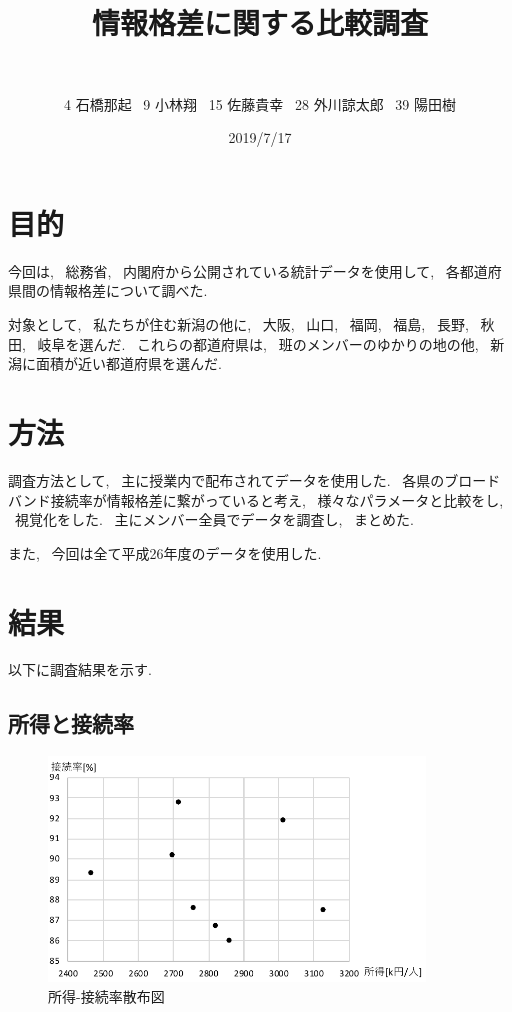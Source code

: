 \documentclass{jsarticle}
\title{情報格差に関する比較調査}
\author{
    \makebox[.975\textwidth]{Ec3 32 平田蓮}　
    \and 4 石橋那起 \ 
    9 小林翔 \ 
    15 佐藤貴幸 \ 
    28 外川諒太郎 \ 
    39 陽田樹
}
\date{2019/7/17}
\begin{document}
\maketitle
\section{目的}
    今回は, ~総務省, ~内閣府から公開されている統計データを使用して,
    ~各都道府県間の情報格差について調べた.

    対象として, ~私たちが住む新潟の他に, ~大阪, ~山口, ~福岡,
    ~福島, ~長野, ~秋田, ~岐阜を選んだ.
    ~これらの都道府県は, ~班のメンバーのゆかりの地の他,
    ~新潟に面積が近い都道府県を選んだ.

\section{方法}
    調査方法として, ~主に授業内で配布されてデータを使用した.
    ~各県のブロードバンド接続率が情報格差に繋がっていると考え,
    ~様々なパラメータと比較をし, ~視覚化をした.
    ~主にメンバー全員でデータを調査し, ~まとめた.

    また, ~今回は全て平成26年度のデータを使用した.

\section{結果}
    以下に調査結果を示す.

    \subsection{所得と接続率}
        \begin{figure}[h]
            \begin{center}
                \includegraphics[width=10cm]{syotoku.pdf}
                \caption{所得-接続率散布図}
                \label{fig:所得}
            \end{center}     
        \end{figure}
\end{document}
